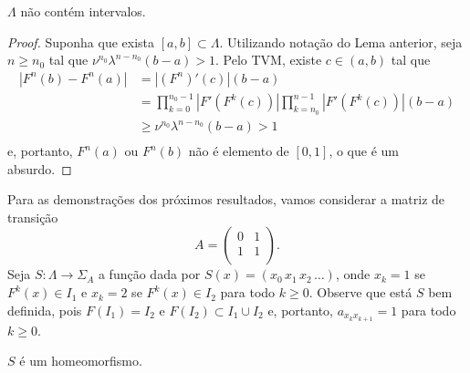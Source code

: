 \begin{lemma}
$\Lambda$ não contém intervalos.
\end{lemma}

\begin{proof}
Suponha que exista $[a, b] \subset \Lambda$. Utilizando notação do Lema anterior, seja $n \geq n_0$ tal que $\nu^{n_0} \lambda^{n - n_0} (b - a) > 1$. Pelo TVM, existe $c \in (a, b)$ tal que
\begin{align*}
|F^n(b) - F^n(a)| & = |(F^n)'(c)|(b-a) \\
& = \prod_{k=0}^{n_0-1} |F'(F^k(c))| \prod_{k=n_0}^{n-1} |F'(F^k(c))| (b-a) \\
& \geq \nu^{n_0} \lambda^{n-n_0} (b-a) > 1 \\
\end{align*}
e, portanto, $F^n(a)$ ou $F^n(b)$ não é elemento de $[0,1]$, o que é um absurdo.
\end{proof}

Para as demonstrações dos próximos resultados, vamos considerar a matriz de transição
$$A =
\begin{pmatrix}
0 & 1 \\
1 & 1 \\
\end{pmatrix}.$$
Seja $S: \Lambda \to \Sigma_A$ a função dada por $S(x) = (x_0 \, x_1 \, x_2 \, \dots)$, onde $x_k = 1$ se $F^k(x) \in I_1$ e $x_k = 2$ se $F^k(x) \in I_2$ para todo $k \geq 0$. Observe que está $S$ bem definida, pois $F(I_1) = I_2$ e $F(I_2) \subset I_1 \cup I_2$ e, portanto, $a_{x_k x_{k+1}} = 1$ para todo $k \geq 0$. 

\begin{proposition}
$S$ é um homeomorfismo.
\end{proposition}


